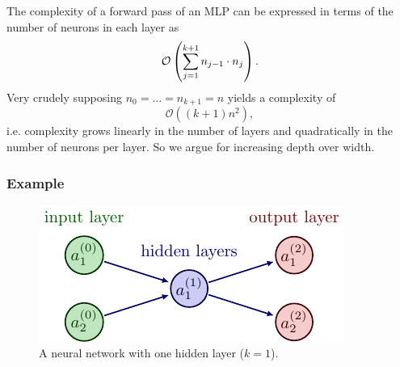 \documentclass[11pt]{article}
\begin{document}
\begin{tcolorbox}[title={\centering\textbf{Advocating for depth over width}}, colback=myLightBlue, colbacktitle=myDarkBlue, colframe=myDarkBlue, coltitle=white]
    The complexity of a forward pass of an MLP can be expressed in terms of the number of neurons in each layer as
    $$
    \mathcal{O}
    \left(
    \sum_{j=1}^{k+1}n_{j-1}\cdot n_j
    \right).
    $$
    Very crudely supposing $n_0=\dots=n_{k+1}=n$ yields a complexity of
    $$
    \mathcal{O}((k+1)n^2),
    $$
    i.e. complexity grows linearly in the number of layers and quadratically in the number of neurons per layer. So we argue for increasing depth over width.
\end{tcolorbox}

\subsubsection{Example}

\begin{figure}[t]
    \centering
    \includegraphics{./figures/neural_nets/MLP_2.pdf}
    \caption{A neural network with one hidden layer ($k=1$).}
    \label{fig:neural_nets_simple_example}
\end{figure}
\end{document}
